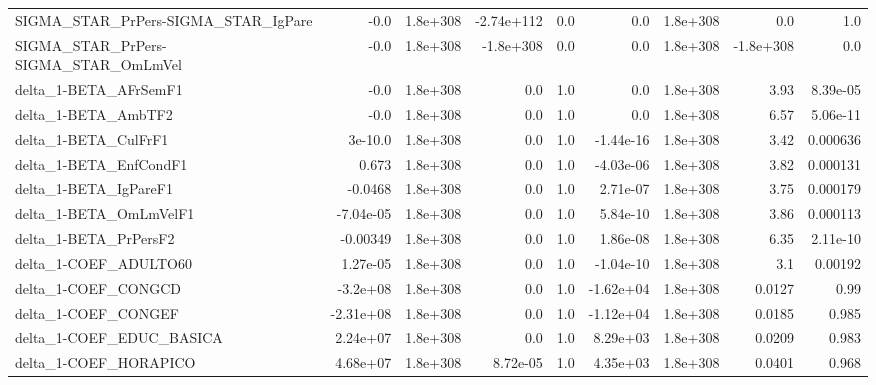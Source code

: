 \begin{tabular}{lrrrrrrrr}
SIGMA\_STAR\_PrPers-SIGMA\_STAR\_IgPare   &        -0.0 &     1.8e+308 & -2.74e+112 &      0.0 &        0.0 &    1.8e+308 &          0.0 &           1.0 \\
SIGMA\_STAR\_PrPers-SIGMA\_STAR\_OmLmVel  &        -0.0 &     1.8e+308 &  -1.8e+308 &      0.0 &        0.0 &    1.8e+308 &    -1.8e+308 &           0.0 \\
delta\_1-BETA\_AFrSemF1                 &        -0.0 &     1.8e+308 &        0.0 &      1.0 &        0.0 &    1.8e+308 &         3.93 &      8.39e-05 \\
delta\_1-BETA\_AmbTF2                   &        -0.0 &     1.8e+308 &        0.0 &      1.0 &        0.0 &    1.8e+308 &         6.57 &      5.06e-11 \\
delta\_1-BETA\_CulFrF1                  &     3e-10.0 &     1.8e+308 &        0.0 &      1.0 &  -1.44e-16 &    1.8e+308 &         3.42 &      0.000636 \\
delta\_1-BETA\_EnfCondF1                &       0.673 &     1.8e+308 &        0.0 &      1.0 &  -4.03e-06 &    1.8e+308 &         3.82 &      0.000131 \\
delta\_1-BETA\_IgPareF1                 &     -0.0468 &     1.8e+308 &        0.0 &      1.0 &   2.71e-07 &    1.8e+308 &         3.75 &      0.000179 \\
delta\_1-BETA\_OmLmVelF1                &   -7.04e-05 &     1.8e+308 &        0.0 &      1.0 &   5.84e-10 &    1.8e+308 &         3.86 &      0.000113 \\
delta\_1-BETA\_PrPersF2                 &    -0.00349 &     1.8e+308 &        0.0 &      1.0 &   1.86e-08 &    1.8e+308 &         6.35 &      2.11e-10 \\
delta\_1-COEF\_ADULTO60                 &    1.27e-05 &     1.8e+308 &        0.0 &      1.0 &  -1.04e-10 &    1.8e+308 &          3.1 &       0.00192 \\
delta\_1-COEF\_CONGCD                   &    -3.2e+08 &     1.8e+308 &        0.0 &      1.0 &  -1.62e+04 &    1.8e+308 &       0.0127 &          0.99 \\
delta\_1-COEF\_CONGEF                   &   -2.31e+08 &     1.8e+308 &        0.0 &      1.0 &  -1.12e+04 &    1.8e+308 &       0.0185 &         0.985 \\
delta\_1-COEF\_EDUC\_BASICA              &    2.24e+07 &     1.8e+308 &        0.0 &      1.0 &   8.29e+03 &    1.8e+308 &       0.0209 &         0.983 \\
delta\_1-COEF\_HORAPICO                 &    4.68e+07 &     1.8e+308 &   8.72e-05 &      1.0 &   4.35e+03 &    1.8e+308 &       0.0401 &         0.968 \\

\end{tabular}
